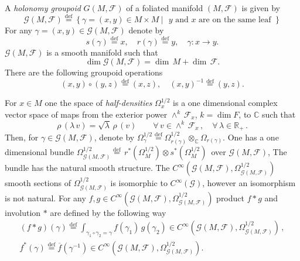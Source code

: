\documentclass{beamer}
\theoremstyle{plain}
\newcommand{\be}{\begin{equation}}
\newcommand{\ee}{\end{equation}}
\newcommand{\C}{\mathbb{C}}
\newcommand{\sF}{\mathcal{F}}       %
\newcommand{\la}{\lambda}
\newcommand{\bydef}{\stackrel{\mathrm{def}}{=}}
\begin{document}
\begin{frame}
A \textit{holonomy groupoid} $G\left(M, \sF\right)$ of a foliated manifold $\left(M, \sF\right)$ is given by
$$
\mathcal G\left(M, \sF\right)\bydef \left\{\left.\gamma = (x, y)\in M\times M~ \right|\text{ $y$ and $x$ are on the same leaf } \right\}
$$
For any  $\gamma = (x, y)\in \mathcal G\left(M, \sF\right)$ denote by
$$
s\left(\gamma\right)\bydef x, \quad  r\left(\gamma\right)\bydef y, \quad \gamma: x \to y.
$$
$\mathcal G\left(M, \sF\right)$ is a smooth manifold such that
$$
\dim \mathcal G\left(M, \sF\right) = \dim \,M + \dim \,\mathcal F.
$$
 There are the following groupoid operations
$$
\left(x, y \right) \circ \left(y, z \right) \bydef \left(x, z \right), \quad \left(x, y \right)^{-1} \bydef \left(y, z\right). 
$$

\end{frame}
\begin{frame}
For
$x\in M$ one the space of \textit{half-densities} $\Omega_x^{1/2}$ is a one dimensional complex
vector space of maps from the exterior power $\wedge^k \,  \mathcal{F}_x$, $k =
\dim F$, to ${\mathbb C}$ such that
$$
\rho \, (\lambda \, v) =\sqrt{\la}\, \rho \, (v)
\qquad \forall \, v \in \wedge^k \,  \mathcal{F}_x \, , \quad \forall \,
\lambda \in {\mathbb R}_+ \, .
$$
Then, for $\gamma \in\mathcal G\left(M, \sF\right)$, denote by $\Omega_{\gamma}^{1/2}\bydef\Omega_{r\left(\gamma\right)}^{1/2} \otimes_\C
\Omega_{r\left(\gamma\right)}$. One has a one dimensional bundle $
\Omega_{\mathcal G\left(M, \sF\right)}^{1/2}\bydef\, r^*(\Omega_M^{1/2})\otimes s^*(\Omega_M^{1/2})\,
$ over $\mathcal G\left(M, \sF\right)$, The bundle has the natural smooth structure. The    $C^{\infty}\left(\mathcal G\left(M, \sF\right) , \Omega^{1/2}_{\mathcal G\left(M, \sF\right)}\right)$  smooth sections of $
\Omega_{\mathcal G\left(M, \sF\right)}^{1/2}$ is isomorphic to  $C^\infty(\mathcal G)$, however an isomorphism is not natural.
For any $f, g \in C^{\infty}\left(\mathcal G\left(M, \sF\right) , \Omega^{1/2}_{\mathcal G\left(M, \sF\right)}\right)$  
product $f* g$ and involution $*$ are defined by the following way
\be\nonumber
\begin{split}
(f * g) (\gamma) \bydef \int_{\gamma_1 \circ \gamma_2 = \gamma}
f(\gamma_1) \, g(\gamma_2)\in C^{\infty}\left(\mathcal G\left(M, \sF\right) , \Omega^{1/2}_{\mathcal G\left(M, \sF\right)}\right)  \,,\\
f^*\left(\gamma \right) \bydef \overline f \left( \gamma^{-1}\right) \in C^{\infty}\left(\mathcal G\left(M, \sF\right) , \Omega^{1/2}_{\mathcal G\left(M, \sF\right)}\right).
\end{split}
\ee
\end{frame}
\end{document}
